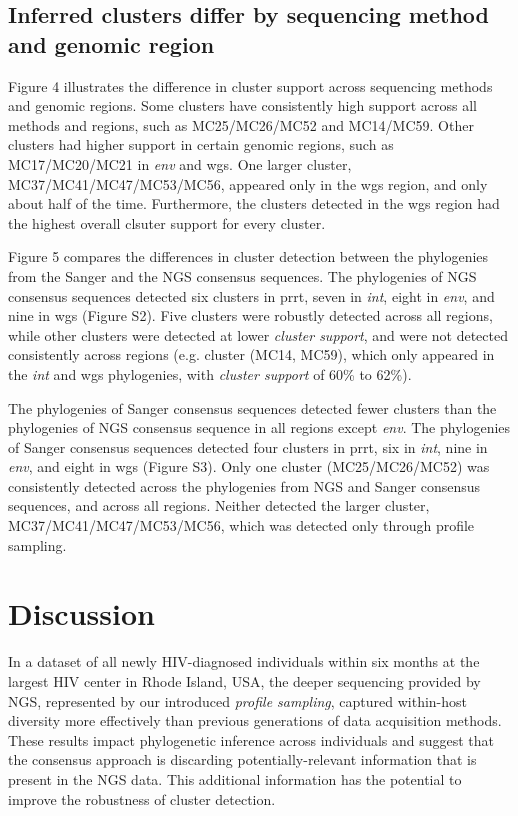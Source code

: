 \documentclass[letterpaper]{article}
\begin{document}
\subsection*{Inferred clusters differ by sequencing method and genomic region}

Figure 4 illustrates the difference in cluster support across sequencing methods and genomic regions. Some clusters have consistently high support across all methods and regions, such as MC25/MC26/MC52 and MC14/MC59. Other clusters had higher support in certain genomic regions, such as MC17/MC20/MC21 in \emph{env} and wgs. One larger cluster, MC37/MC41/MC47/MC53/MC56, appeared only in the wgs region, and only about half of the time. Furthermore, the clusters detected in the wgs region had the highest overall clsuter support for every cluster.

Figure 5 compares the differences in cluster detection between the phylogenies from the Sanger and the NGS consensus sequences. The phylogenies of NGS consensus sequences detected six clusters in prrt, seven in \emph{int}, eight in \emph{env}, and nine in wgs (Figure S2). Five clusters were robustly detected across all regions, while other clusters were detected at lower \emph{cluster support}, and were not detected consistently across regions (e.g. cluster (MC14, MC59), which only appeared in the \emph{int} and wgs phylogenies, with \emph{cluster support} of 60\% to 62\%).

The phylogenies of Sanger consensus sequences detected fewer clusters than the phylogenies of NGS consensus sequence in all regions except \emph{env}. The phylogenies of Sanger consensus sequences detected four clusters in prrt, six in \emph{int}, nine in \emph{env}, and eight in wgs (Figure S3). Only one cluster (MC25/MC26/MC52) was consistently detected across the phylogenies from NGS and Sanger consensus sequences, and across all regions. Neither detected the larger cluster, MC37/MC41/MC47/MC53/MC56, which was detected only through profile sampling.

\section*{Discussion}

In a dataset of all newly HIV-diagnosed individuals within six months at the largest HIV center in Rhode Island, USA, the deeper sequencing provided by NGS, represented by our introduced \emph{profile sampling}, captured within-host diversity more effectively than previous generations of data acquisition methods. These results impact phylogenetic inference across individuals and suggest that the consensus approach is discarding potentially-relevant information that is present in the NGS data. This additional information has the potential to improve the robustness of cluster detection.
\end{document}

